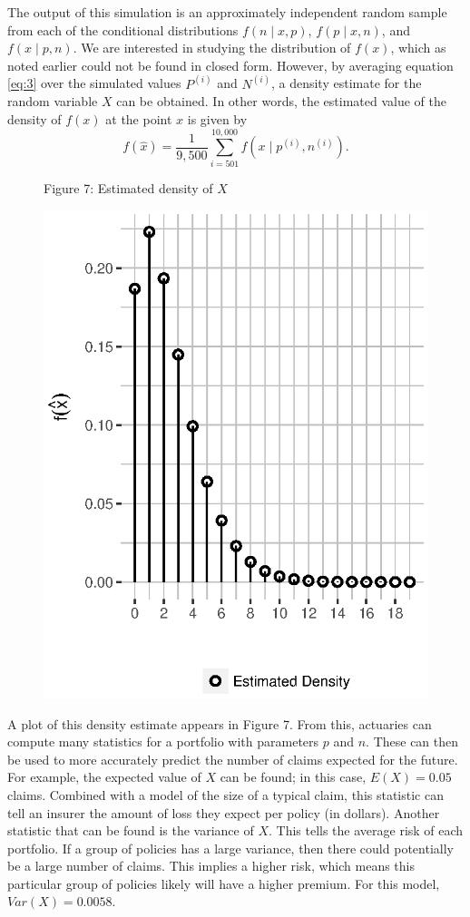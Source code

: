 \documentclass[11pt, oneside]{article}
\newcommand*{\figuretitle}[1]{
    {\centering
    \tiny{#1}
    \par\medskip}
}
\begin{document}
The output of this simulation is an approximately independent random sample from each of the conditional distributions $f(n\!\mid\! x,p)$, $f(p\!\mid\! x, n)$, and $f(x\!\mid\! p, n)$. We are interested in studying the distribution of $f(x)$, which as noted earlier could not be found in closed form. However, by averaging equation \ref{eq:3} over the simulated values $P^{(i)}$ and $N^{(i)}$, a density estimate for the random variable $X$ can be obtained. In other words, the estimated value of the density of $f(x)$ at the point $x$ is given by
\[
f(\hat{x})=\frac{1}{9,500}\sum_{i=501}^{10,000}f(x\mid p^{(i)},n^{(i)}).
\]
\begin{figure}
   \figuretitle{Figure 7: Estimated density of $X$}
   \centering\includegraphics[width=\textwidth]{Figure7}\vspace{-30pt}
\end{figure}

A plot of this density estimate appears in Figure 7. From this, actuaries can compute many statistics for a portfolio with parameters $p$ and $n$. These can then be used to more accurately predict the number of claims expected for the future. For example, the expected value of $X$ can be found; in this case, $E(X)=0.05$ claims. Combined with a model of the size of a typical claim, this statistic can tell an insurer the amount of loss they expect per policy (in dollars). Another statistic that can be found is the variance of $X$. This tells the average risk of each portfolio. If a group of policies has a large variance, then there could potentially be a large number of claims. This implies a higher risk, which means this particular group of policies likely will have a higher premium. For this model, $Var(X)=0.0058$.
\end{document}
